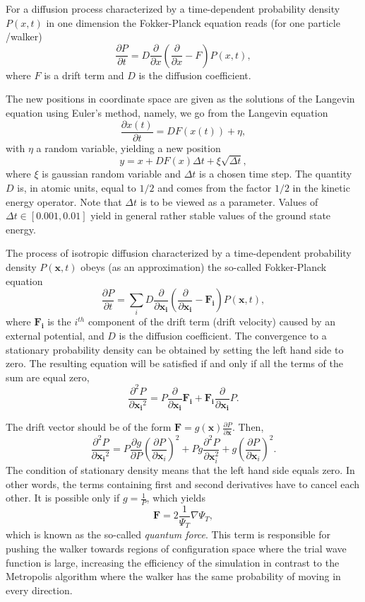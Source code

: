 \documentclass[%
oneside,                 %
final,                   %
10pt]{article}
\begin{document}
For a diffusion process characterized by a time-dependent probability density $P(x,t)$ in one dimension the Fokker-Planck
equation reads (for one particle /walker) 
\[
   \frac{\partial P}{\partial t} = D\frac{\partial }{\partial x}\left(\frac{\partial }{\partial x} -F\right)P(x,t),
\]
where $F$ is a drift term and $D$ is the diffusion coefficient. 

The new positions in coordinate space are given as the solutions of the Langevin equation using Euler's method, namely,
we go from the Langevin equation
\[ 
   \frac{\partial x(t)}{\partial t} = DF(x(t)) +\eta,
\]
with $\eta$ a random variable,
yielding a new position 
\[
   y = x+DF(x)\Delta t +\xi\sqrt{\Delta t},
\]
where $\xi$ is gaussian random variable and $\Delta t$ is a chosen time step. 
The quantity $D$ is, in atomic units, equal to $1/2$ and comes from the factor $1/2$ in the kinetic energy operator. Note that $\Delta t$ is to be viewed as a parameter. Values of $\Delta t \in [0.001,0.01]$ yield in general rather stable values of the ground state energy.  

The process of isotropic diffusion characterized by a time-dependent probability density $P(\mathbf{x},t)$ obeys (as an approximation) the so-called Fokker-Planck equation 
\[
   \frac{\partial P}{\partial t} = \sum_i D\frac{\partial }{\partial \mathbf{x_i}}\left(\frac{\partial }{\partial \mathbf{x_i}} -\mathbf{F_i}\right)P(\mathbf{x},t),
\]
where $\mathbf{F_i}$ is the $i^{th}$ component of the drift term (drift velocity) caused by an external potential, and $D$ is the diffusion coefficient. The convergence to a stationary probability density can be obtained by setting the left hand side to zero. The resulting equation will be satisfied if and only if all the terms of the sum are equal zero,
\[
\frac{\partial^2 P}{\partial {\mathbf{x_i}^2}} = P\frac{\partial}{\partial {\mathbf{x_i}}}\mathbf{F_i} + \mathbf{F_i}\frac{\partial}{\partial {\mathbf{x_i}}}P.
\]

The drift vector should be of the form $\mathbf{F} = g(\mathbf{x}) \frac{\partial P}{\partial \mathbf{x}}$. Then,
\[
\frac{\partial^2 P}{\partial {\mathbf{x_i}^2}} = P\frac{\partial g}{\partial P}\left( \frac{\partial P}{\partial {\mathbf{x}_i}}  \right)^2 + P g \frac{\partial ^2 P}{\partial {\mathbf{x}_i^2}}  + g \left( \frac{\partial P}{\partial {\mathbf{x}_i}}  \right)^2.
\]
The condition of stationary density means that the left hand side equals zero. In other words, the terms containing first and second derivatives have to cancel each other. It is possible only if $g = \frac{1}{P}$, which yields
\[
\mathbf{F} = 2\frac{1}{\Psi_T}\nabla\Psi_T,
\]
which is known as the so-called \emph{quantum force}. This term is responsible for pushing the walker towards regions of configuration space where the trial wave function is large, increasing the efficiency of the simulation in contrast to the Metropolis algorithm where the walker has the same probability of moving in every direction.
\end{document}
